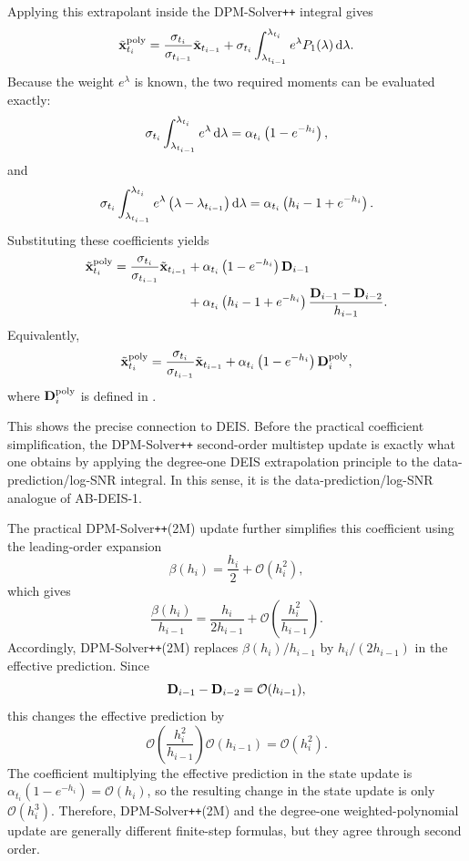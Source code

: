 Applying this extrapolant inside the DPM-Solver\texttt{++} integral gives
\[
\tilde{{\mathbf{x}}}_{t_i}^{\mathrm{poly}}
=
\frac{\sigma_{t_i}}{\sigma_{t_{i-1}}}
\tilde{{\mathbf{x}}}_{t_{i-1}}
+
\sigma_{t_i}
\int_{\lambda_{t_{i-1}}}^{\lambda_{t_i}}
e^\lambda
P_1(\lambda)
\mathop{}\!\mathrm{d}\lambda.
\]
Because the weight $e^\lambda$ is known, the two required moments can be
evaluated exactly:
\[
\sigma_{t_i}
\int_{\lambda_{t_{i-1}}}^{\lambda_{t_i}}
e^\lambda\mathop{}\!\mathrm{d}\lambda
=
\alpha_{t_i}
\left(
1-e^{-h_i}
\right),
\]
and
\[
\sigma_{t_i}
\int_{\lambda_{t_{i-1}}}^{\lambda_{t_i}}
e^\lambda
\left(
\lambda-\lambda_{t_{i-1}}
\right)
\mathop{}\!\mathrm{d}\lambda
=
\alpha_{t_i}
\left(
h_i-1+e^{-h_i}
\right).
\]
Substituting these coefficients yields
\begin{align*}
\tilde{{\mathbf{x}}}_{t_i}^{\mathrm{poly}}
=
\frac{\sigma_{t_i}}{\sigma_{t_{i-1}}}
\tilde{{\mathbf{x}}}_{t_{i-1}}
&+
\alpha_{t_i}
\left(
1-e^{-h_i}
\right)
{\mathbf{D}}_{i-1}
\\
&+
\alpha_{t_i}
\left(
h_i-1+e^{-h_i}
\right)
\frac{
{\mathbf{D}}_{i-1}-{\mathbf{D}}_{i-2}
}{
h_{i-1}
}.
\end{align*}
Equivalently,
\[
\tilde{{\mathbf{x}}}_{t_i}^{\mathrm{poly}}
=
\frac{\sigma_{t_i}}{\sigma_{t_{i-1}}}
\tilde{{\mathbf{x}}}_{t_{i-1}}
+
\alpha_{t_i}
\left(
1-e^{-h_i}
\right)
{\mathbf{D}}_i^{\mathrm{poly}},
\]
where ${\mathbf{D}}_i^{\mathrm{poly}}$ is defined in
.

This shows the precise connection to DEIS. Before the practical coefficient
simplification, the DPM-Solver\texttt{++} second-order multistep update is
exactly what one obtains by applying the degree-one DEIS extrapolation
principle to the data-prediction/log-SNR integral. In this sense, it is the
data-prediction/log-SNR analogue of AB-DEIS-1.

The practical DPM-Solver\texttt{++}(2M) update further simplifies this
coefficient using the leading-order expansion
\[
\beta(h_i)
=
\frac{h_i}{2}
+
\mathcal O(h_i^2),
\]
which gives
\[
\frac{\beta(h_i)}{h_{i-1}}
=
\frac{h_i}{2h_{i-1}}
+
\mathcal O\left(
\frac{h_i^2}{h_{i-1}}
\right).
\]
Accordingly, DPM-Solver\texttt{++}(2M) replaces
$\beta(h_i)/h_{i-1}$ by $h_i/(2h_{i-1})$ in the effective prediction.
Since
\[
{\mathbf{D}}_{i-1}-{\mathbf{D}}_{i-2}
=
\mathcal O(h_{i-1}),
\]
this changes the effective prediction by
\[
\mathcal O\left(
\frac{h_i^2}{h_{i-1}}
\right)
\mathcal O(h_{i-1})
=
\mathcal O(h_i^2).
\]
The coefficient multiplying the effective prediction in the state update is
$\alpha_{t_i}(1-e^{-h_i})=\mathcal O(h_i)$, so the resulting change in the
state update is only $\mathcal O(h_i^3)$. Therefore,
DPM-Solver\texttt{++}(2M) and the degree-one weighted-polynomial update are
generally different finite-step formulas, but they agree through second
order.

